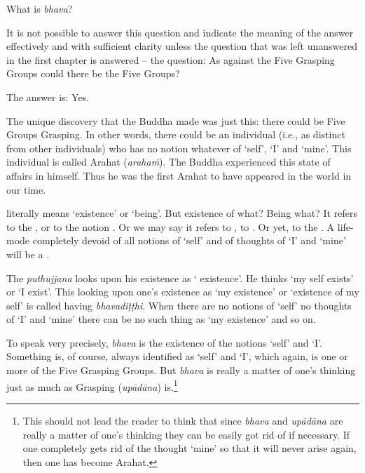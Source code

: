 What is \emph{bhava}?

It is not possible to answer this question and indicate the meaning of the answer effectively and with sufficient clarity unless the question that was left unanswered in the first chapter is answered -- the question: As against the Five Grasping Groups could there be  the Five Groups?

The answer is: Yes.

The unique discovery that the Buddha made was just this: there could be Five Groups  Grasping. In other words, there could be an individual (i.e., as distinct from other individuals) who has no notion whatever of `self', `I' and `mine'. This individual is called Arahat (\emph{arahaṁ}).  The Buddha experienced this state of affairs in himself. Thus he was the first Arahat to have appeared in the world in our time.

 literally means `existence' or `being'. But existence of what? Being what? It refers to the , or to the notion . Or we may say it refers to , to . Or yet, to the . A life-mode completely devoid of all notions of `self' and of thoughts of `I' and `mine' will  be a .

The \emph{puthujjana} looks upon his existence as ` existence'. He thinks `my self exists' or `I exist'. This looking upon one's existence as `my existence' or `existence of my self' is called having \emph{bhavadiṭṭhi}. When there are no notions of `self' no thoughts of `I' and `mine' there can be no such thing as `my existence' and so on.

To speak very precisely, \emph{bhava} is the existence of the notions `self' and `I'. Something is, of course, always identified as `self' and `I', which again, is one or more of the Five Grasping Groups. But \emph{bhava} is really a matter of one's thinking just as much as Grasping (\emph{upādāna}) is.\footnote{This should not lead the reader to think that since \emph{bhava} and \emph{upādāna} are really a matter of one's thinking they can be easily got rid of if necessary. If one completely gets rid of the thought `mine' so that it will never arise again, then one has become Arahat.}

